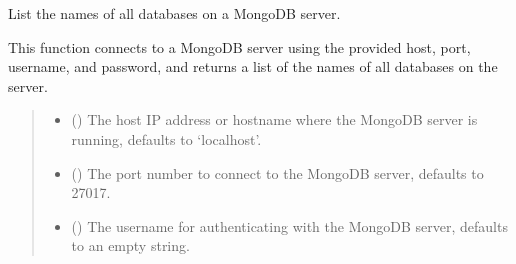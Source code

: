 \documentclass[letterpaper,10pt,english]{sphinxmanual}
\begin{document}
\begin{fulllineitems}
\label{\detokenize{forensicfit.database.database:forensicfit.database.database.list_databases}}
\pysigstartsignatures
{}
\pysigstopsignatures
\sphinxAtStartPar
List the names of all databases on a MongoDB server.

\sphinxAtStartPar
This function connects to a MongoDB server using the provided host, port, username, and password,
and returns a list of the names of all databases on the server.
\begin{quote}\begin{description}
\sphinxAtStartPar
\sphinxcode{\sphinxupquote{List}}{[}\sphinxcode{\sphinxupquote{str}}{]}

\begin{itemize}
\item {} 
\sphinxAtStartPar
{} (\sphinxstyleliteralemphasis{\sphinxupquote{, }}) \textendash{} The host IP address or hostname where the MongoDB server is running, defaults to ‘localhost’.

\item {} 
\sphinxAtStartPar
{} (\sphinxstyleliteralemphasis{\sphinxupquote{, }}) \textendash{} The port number to connect to the MongoDB server, defaults to 27017.

\item {} 
\sphinxAtStartPar
{} (\sphinxstyleliteralemphasis{\sphinxupquote{, }}) \textendash{} The username for authenticating with the MongoDB server, defaults to an empty string.


\end{itemize}
\end{description}
\end{quote}
\end{fulllineitems}
\end{document}
